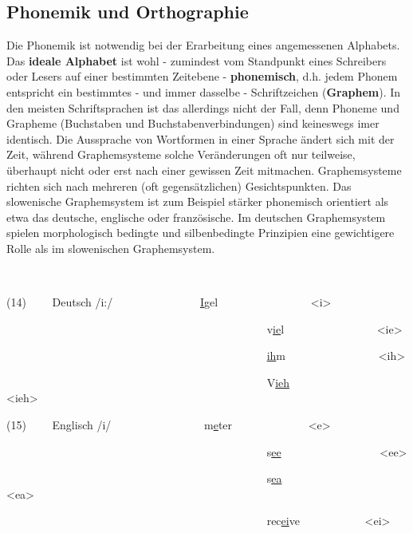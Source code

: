 \documentclass[
]{article}
\begin{document}
\hypertarget{phonemik-und-orthographie}{%
\subsection{Phonemik und Orthographie}\label{phonemik-und-orthographie}}

Die Phonemik ist notwendig bei der Erarbeitung eines angemessenen
Alphabets. Das \textbf{ideale Alphabet} ist wohl - zumindest vom Standpunkt
eines Schreibers oder Lesers auf einer bestimmten Zeitebene -
\textbf{phonemisch}, d.h. jedem Phonem entspricht ein bestimmtes - und immer
dasselbe - Schriftzeichen (\textbf{Graphem}). In den meisten Schriftsprachen
ist das allerdings nicht der Fall, denn Phoneme und Grapheme (Buchstaben
und Buchstabenverbindungen) sind keineswegs imer identisch. Die
Aussprache von Wortformen in einer Sprache ändert sich mit der Zeit,
während Graphemsysteme solche Veränderungen oft nur teilweise, überhaupt
nicht oder erst nach einer gewissen Zeit mitmachen. Graphemsysteme
richten sich nach mehreren (oft gegensätzlichen) Gesichtspunkten. Das
slowenische Graphemsystem ist zum Beispiel stärker phonemisch orientiert
als etwa das deutsche, englische oder französische. Im deutschen
Graphemsystem spielen morphologisch bedingte und silbenbedingte
Prinzipien eine gewichtigere Rolle als im slowenischen Graphemsystem.

~

(14)~~~~ Deutsch /i:/~~~~~~~~~~~~~~~ \underline{I}gel~~~~~~~~~~~~~~~~ \textless i\textgreater{}

~~~~~~~~~~~~~~~~~~~~~~~~~~~~~~~~~~~~~~~~~~~~~~
v\underline{ie}l~~~~~~~~~~~~~~~~ \textless ie\textgreater{}

~~~~~~~~~~~~~~~~~~~~~~~~~~~~~~~~~~~~~~~~~~~~~~
\underline{ih}m~~~~~~~~~~~~~~~~ \textless ih\textgreater{}

~~~~~~~~~~~~~~~~~~~~~~~~~~~~~~~~~~~~~~~~~~~~~~
V\underline{ieh}~~~~~~~~~~~~~~~ \textless ieh\textgreater{}

(15)~~~~ Englisch /i/~~~~~~~~~~~~~~~~ m\underline{e}ter~~~~~~~~~~~~~ \textless e\textgreater{}

~~~~~~~~~~~~~~~~~~~~~~~~~~~~~~~~~~~~~~~~~~~~~~
s\underline{ee}~~~~~~~~~~~~~~~~~ \textless ee\textgreater{}

~~~~~~~~~~~~~~~~~~~~~~~~~~~~~~~~~~~~~~~~~~~~~~
s\underline{ea}~~~~~~~~~~~~~~~~~ \textless ea\textgreater{}

~~~~~~~~~~~~~~~~~~~~~~~~~~~~~~~~~~~~~~~~~~~~~~ rec\underline{ei}ve~~~~~~~~~~~
\textless ei\textgreater{}
\end{document}
